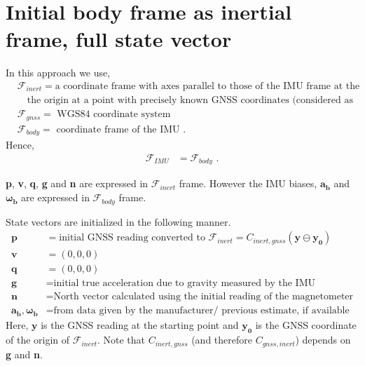 \documentclass{article}
\begin{document}
\newpage
\section{Initial body frame as inertial frame, full state vector}

In this approach we use,
\begin{align}
    &\mathcal{F}_{inert}=\text{a coordinate frame with axes parallel to those of the IMU frame at the initialization, and} \nonumber \\
    &\quad \text{the origin at a point with precisely known GNSS coordinates (considered as an inertial frame)} \nonumber \\
    &\mathcal{F}_{gnss}=\text{ WGS84 coordinate system} \nonumber \\
    &\mathcal{F}_{body}=\text{ coordinate frame of the IMU} \text{ .}
\end{align}{}
Hence,
\begin{align}
    \mathcal{F}_{IMU}&=\mathcal{F}_{body} \text{ .}
\end{align}{}

\textbf{p}, \textbf{v}, \textbf{q}, \textbf{g} and \textbf{n} are expressed in $\mathcal{F}_{inert}$ frame. However the IMU biases, $\boldsymbol{a_b}$ and $\boldsymbol{\omega_b}$ are expressed in $\mathcal{F}_{body}$ frame.

State vectors are initialized in the following manner.
\begin{align}
    \textbf{p}&=\text{initial GNSS reading converted to }\mathcal{F}_{inert} = C_{inert,gnss}\left(\boldsymbol{y}\ominus\boldsymbol{y_0}\right) \\
    \textbf{v}&=\left(0,0,0\right) \\
    \textbf{q}&=\left(0,0,0\right)\\
    \textbf{g}&=\text{initial true acceleration due to gravity measured by the IMU} \\
    \textbf{n}&=\text{North vector calculated using the initial reading of the magnetometer} \\
    \boldsymbol{a_b},\boldsymbol{\omega_b}&=\text{from data given by the manufacturer/ previous estimate, if available}
\end{align}{}
Here, $\boldsymbol{y}$ is the GNSS reading at the starting point and $\boldsymbol{y_0}$ is the GNSS coordinate of the origin of $\mathcal{F}_{inert}$. Note that $C_{inert,gnss}$ (and therefore $C_{gnss,inert}$) depends on \textbf{g} and \textbf{n}.
\end{document}
